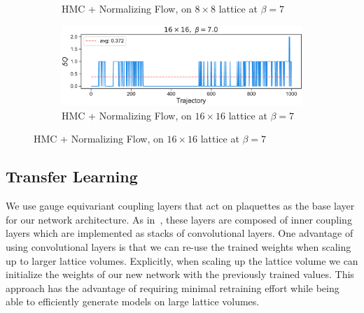 \documentclass[a4paper,11pt]{article}
\begin{document}
\begin{figure}[htpb]
\begin{subfigure}[b]{0.49\textwidth}
        \caption{\label{subfig:dqftHMC8}HMC + Normalizing Flow, on \(8 \times
        8\) lattice at \(\beta = 7\)}
    \end{subfigure}
    \hfill
    \begin{subfigure}[b]{0.49\textwidth}
        \includegraphics[width=\textwidth]{assets/dqftHMC_16x16_beta7.pdf}
        \caption{\label{subfig:dqftHMC16}HMC + Normalizing Flow, on
        \(16 \times 16\) lattice at \(\beta = 7\)}
    \end{subfigure}
\end{figure}
%
\subsection{\label{subsec:transfer}Transfer Learning}
%
We use gauge equivariant coupling layers that act on plaquettes as the
base layer for our network architecture.
%
As in~\cite{Albergo:2021vyo}, these layers are composed of inner coupling
layers which are implemented as stacks of convolutional layers.
%
One advantage of using convolutional layers is that we can re-use the trained
weights when scaling up to larger lattice volumes.
%
Explicitly, when scaling up the lattice volume we can initialize the weights
of our new network with the previously trained values.
%
This approach has the advantage of requiring minimal retraining effort while
being able to efficiently generate models on large lattice volumes.






\end{document}
